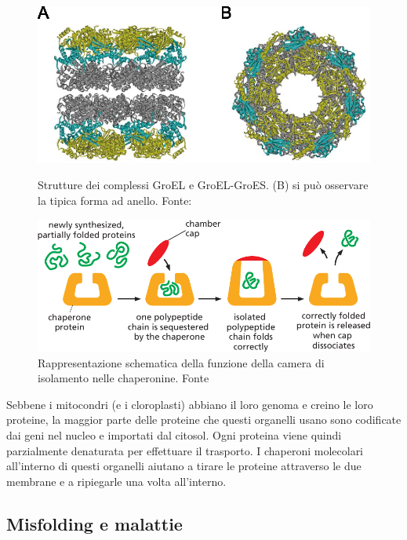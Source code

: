 \begin{figure}[!htb]
	\includegraphics[scale=0.25]{images/groel.png}
	\caption{Strutture dei complessi GroEL e GroEL-GroES. (B) si può osservare la tipica forma ad anello. Fonte: \cite{Iizuka2016ChaperoninGU}}
	\label{fig:groel}
	\endminipage\hfill
	\centering
	\includegraphics[scale=0.4]{images/chaperone-alberts-isolation.png}
	\caption{Rappresentazione schematica della funzione della camera di isolamento nelle chaperonine. Fonte \cite{alberts2018essential}}
	\label{fig:chaperone-camera}
	\endminipage\hfill
\end{figure}

Sebbene i mitocondri (e i cloroplasti) abbiano il loro genoma e creino le loro proteine, la maggior parte delle proteine che questi organelli usano sono codificate dai geni nel nucleo e importati dal citosol. Ogni proteina viene quindi parzialmente denaturata per effettuare il trasporto. I chaperoni molecolari all'interno di questi organelli aiutano a tirare le proteine attraverso le due membrane e a ripiegarle una volta all'interno\supercite{alberts2018essential}.


\subsection{Misfolding e malattie}


